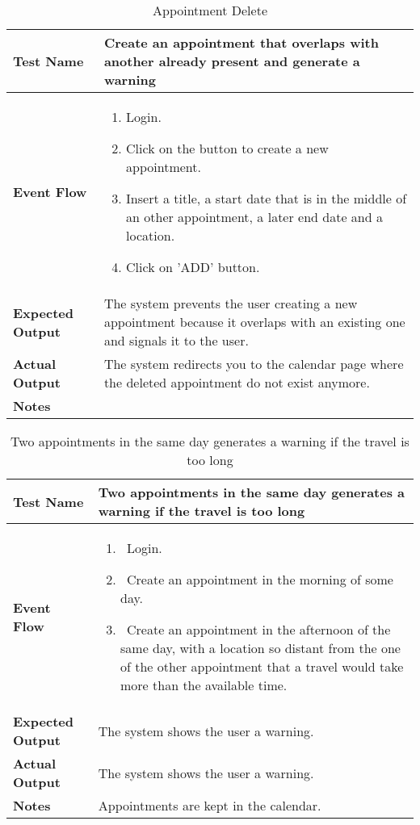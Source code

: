 \begin{table}[h]	
	\centering
	\def\arraystretch{1.5}
	\begin{tabular}{|m{7cm}|m{7cm}|}
		\hline
		\textbf{Test Name}            & Create an appointment that overlaps with another already present and generate a warning  \\ \hline
		\textbf{Event Flow}             & 
		\begin{enumerate}
			\item Login.
			\item Click on the button to create a new appointment.
			\item Insert a title, a start date that is in the middle of an other appointment, a later end date and a location.
			\item Click on 'ADD' button.
		\end{enumerate} \\ \hline
		\textbf{Expected Output}  &  The system prevents the user creating a new appointment because it overlaps with an existing one and signals it to the user.  \\ \hline
		\textbf{Actual Output}       & The system redirects you to the calendar page where the deleted appointment do not exist anymore.    \\ \hline
		\textbf{Notes} & \\ \hline
	\end{tabular}
	\caption{Appointment Delete}
\end{table}


\begin{table}[h]	
\centering
\def\arraystretch{1.5}
\begin{tabular}{|m{7cm}|m{7cm}|}
	\hline
	\textbf{Test Name}            &  Two appointments in the same day generates a warning if the travel is too long  \\ \hline
	\textbf{Event Flow}             &   
		\begin{enumerate}
			\item~Login.
			\item~Create an appointment in the morning of some day.
			\item~Create an appointment in the afternoon of the same day, with a location so distant from the one of the other appointment that a travel would take more than the available time.
		\end{enumerate}
	\\ \hline
	\textbf{Expected Output}  &  The system shows the user a warning.   \\ \hline
	\textbf{Actual Output}       &   The system shows the user a warning.  \\ \hline
	\textbf{Notes} &  Appointments are kept in the calendar.   \\ \hline
\end{tabular}
\caption{Two appointments in the same day generates a warning if the travel is too long}
\end{table}


